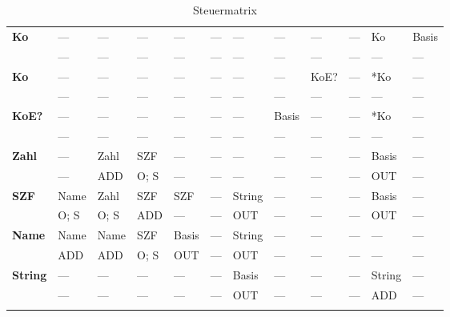 \begin{table}[H]
\begin{tabular}{@{}l|*{11}{l}@{}}
		\multirow{2}{*}{{\bfseries\scriptsize Ko}}		&
		  ---		& ---		& ---	& ---		& ---		& ---		& --- & --- & --- & Ko	& Basis \\
		& ---		& ---		& ---	& ---		& ---		& ---		& ---	& ---	& ---	& ---	& --- 	\\
		\cmidrule{1-12}			
			
		\multirow{2}{*}{{\bfseries\scriptsize *Ko}}		&
		  ---		& ---		& ---	& ---		& ---		& ---		& --- & KoE?	& --- & *Ko	& --- \\
		& ---		& ---		& ---	& ---		& ---		& ---		& ---	& ---		& ---	& ---	& ---	\\
		\cmidrule{1-12}			
			
		\multirow{2}{*}{{\bfseries\scriptsize KoE?}}	&
		  ---		& ---		& ---	& ---		& ---		& ---		& Basis	& ---	& --- & *Ko	& --- \\
		& ---		& ---		& ---	& ---		& ---		& ---		& ---		& ---	& ---	& ---	& ---	\\
		\cmidrule{1-12}			
			
		\multirow{2}{*}{{\bfseries\scriptsize Zahl}}	&
		  ---		& Zahl	& SZF		& ---		& ---		& ---		& ---	& ---	& --- & Basis	& --- \\
		& ---		& ADD		& O; S	& ---		& ---		& ---		& ---	& ---	& ---	& OUT		& ---	\\
		\cmidrule{1-12}		

		\multirow{2}{*}{{\bfseries\scriptsize SZF}}		&
		  Name	& Zahl	& SZF	& SZF	& ---		& String	& ---	& ---	& --- & Basis	& --- \\
		& O; S	& O; S	& ADD	& ---	& ---		& OUT			& ---	& ---	& ---	& OUT		& ---	\\
		\cmidrule{1-12}
		
		\multirow{2}{*}{{\bfseries\scriptsize Name}}	&
		  Name	& Name	& SZF		& Basis	& ---	& String	& ---	& ---	& --- & ---	& --- \\
		& ADD		& ADD		& O; S	& OUT		& ---	& OUT			& ---	& ---	& ---	& ---	& ---	\\
		\cmidrule{1-12}

		\multirow{2}{*}{{\bfseries\scriptsize String}}	&
		  ---		& ---		& ---	& ---		& ---		& Basis	& ---	& ---	& --- & String	& --- \\
		& ---		& ---		& ---	& ---		& ---		& OUT		& ---	& ---	& ---	& ADD			& ---	\\
						
		\addlinespace
		\bottomrule
		
		\end{tabular}
	\caption{Steuermatrix}
	\label{tab:Steuermatrix}
\end{table}